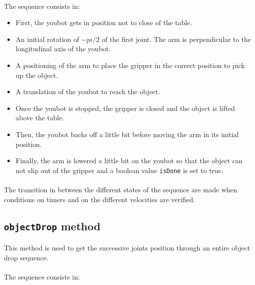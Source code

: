 \documentclass[12pt,a4paper]{article}
\begin{document}
\paragraph{} The sequence consists in:

\begin{itemize}
\item First, the youbot gets in position not to close of the table.

\item An initial rotation of $-pi/2$ of the first joint. The arm is perpendicular to the longitudinal axis of the youbot.

\item A positioning of the arm to place the gripper in the correct position to pick up the object.

\item A translation of the youbot to reach the object.

\item Once the youbot is stopped, the gripper is closed and the object is lifted above the table.

\item Then, the youbot backs off a little bit before moving the arm in its initial position.

\item Finally, the arm is lowered a little bit on the youbot so that the object can not slip out of the gripper and a boolean value \texttt{isDone} is set to true.
\end{itemize}

\paragraph{} The transition in between the different states of the sequence are made when conditions on timers and on the different velocities are verified.

\subsection{\texttt{objectDrop} method}
\paragraph{} This method is used to get the successive joints position through an entire object drop sequence.

\paragraph{} The sequence consists in:
\end{document}
